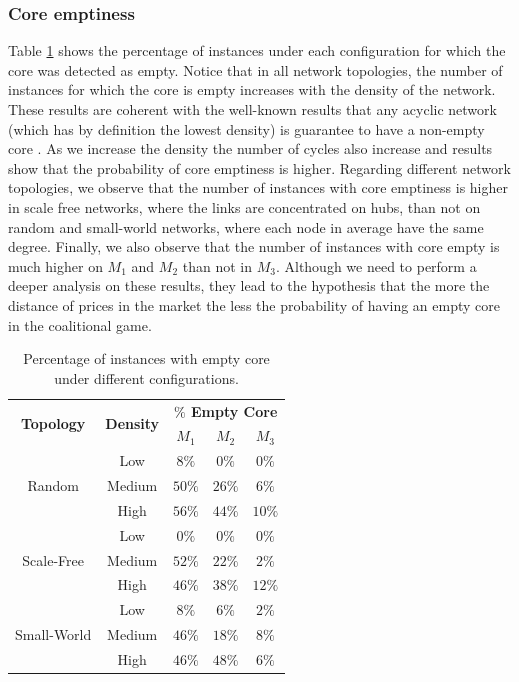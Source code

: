 \documentclass[11pt, twoside, titlepage, a4paper, openright]{report}
\begin{document}
\subsubsection{Core emptiness}
Table \ref{tab:percentage_core_emptiness} shows the percentage of
instances under each configuration for which the core was detected as empty.
Notice that in all network topologies, the number of instances for which the core is empty
increases with the density of the network. These results are coherent with the
well-known results that any acyclic network (which has by definition the
lowest density) is guarantee to have a non-empty core \cite{RePEc:ucp:jpolec:v:112:y:2004:i:4:p:754-778}. As we
increase the density the number of cycles also increase and results show that the probability
of core emptiness is higher.
Regarding different network topologies, we observe that the number of instances
with core emptiness is higher in scale free networks, where the links are
concentrated on hubs, than not on random and small-world networks, where each
node in average have the same degree.
Finally, we also observe that the number of instances with core empty is much
higher on $M_1$ and $M_2$ than not in $M_3$. Although we need to perform a deeper
analysis on these results, they lead to the hypothesis that the more the
distance of prices in the market the less the probability of having an empty
core in the coalitional game.

\begin{table}[!ht]
\centering
\begin{tabular}{ | c | c | c |  c | c |}
\hline
\multirow{2}{*}{\textbf{Topology}} & \multirow{2}{*}{\textbf{Density}}&\multicolumn{3}{c|}{ \textbf{$\%$   Empty Core}}\\
\cline{3-5}
& & $M_1$ & $M_2$ & $M_3$ \\
\hline
\multirow{3}{*}{Random} & Low &  $  8\%$ & $ 0\% $ & $ 0\% $ \\
 & Medium &  $  50\%$ & $ 26\% $ & $ 6\% $ \\
 & High &  $  56\%$ & $ 44\% $ & $ 10\% $ \\
\hline
\multirow{3}{*}{Scale-Free} & Low &  $  0\%$ & $ 0\% $ & $ 0\% $ \\
 & Medium &  $  52\%$ & $ 22\% $ & $ 2\% $ \\
 & High &  $  46\%$ & $ 38\% $ & $ 12\% $ \\
\hline
\multirow{3}{*}{Small-World} & Low &  $  8\%$ & $ 6\% $ & $ 2\% $ \\
 & Medium &  $  46\%$ & $ 18\% $ & $ 8\% $ \\
 & High &  $  46\%$ & $ 48\% $ & $ 6\% $ \\
\hline
\end{tabular}
\caption{\label{tab:percentage_core_emptiness} Percentage of instances with empty core under different configurations.}
\end{table}
\end{document}
